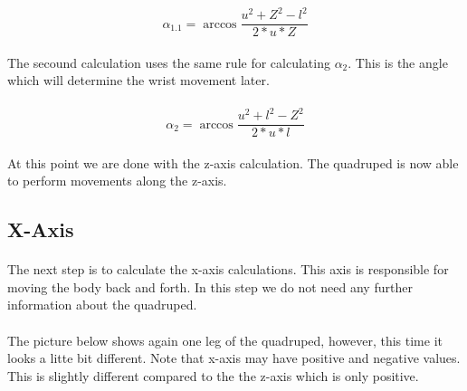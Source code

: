 \documentclass{article}
\begin{document}
    \paragraph{}

    \begin{equation} \label{alpha_1_z}
        \alpha_{1.1} = \arccos \frac{u^2 + Z^2 - l^2}{2 * u * Z} 
    \end{equation}

    \paragraph{}
    The secound calculation uses the same rule for calculating $\alpha_2$. This is the angle which will determine the wrist movement later.

    \paragraph{}
    \begin{equation}
        \alpha_2 = \arccos \frac{u^2 + l^2 - Z^2}{2 * u * l} 
    \end{equation}

    \paragraph{}
    At this point we are done with the z-axis calculation. The quadruped is now able to perform movements along the z-axis.



    \pagebreak
    \subsection{X-Axis}
    \paragraph{} %
    The next step is to calculate the x-axis calculations. This axis is responsible for moving the body back and forth. In this step we do not need any further information about the quadruped.

    \paragraph{}
    The picture below shows again one leg of the quadruped, however, this time it looks a litte bit different. Note that x-axis may have positive and negative values. This is slightly different compared to the the z-axis which is only positive. 
\end{document}
